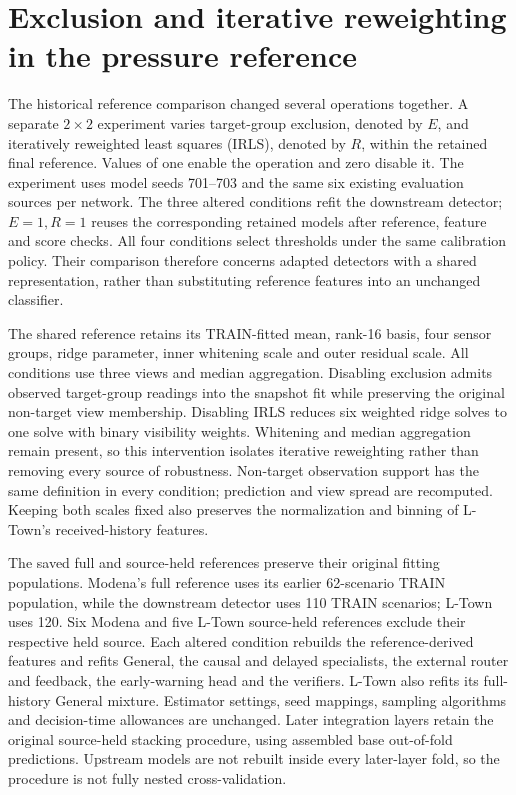 \section{Exclusion and iterative reweighting in the pressure reference}
\label{sec:reference_factorial}
The historical reference comparison changed several operations together. A separate $2\times2$ experiment varies target-group exclusion, denoted by $E$, and iteratively reweighted least squares (IRLS), denoted by $R$, within the retained final reference. Values of one enable the operation and zero disable it. The experiment uses model seeds 701--703 and the same six existing evaluation sources per network. The three altered conditions refit the downstream detector; $E=1,R=1$ reuses the corresponding retained models after reference, feature and score checks. All four conditions select thresholds under the same calibration policy. Their comparison therefore concerns adapted detectors with a shared representation, rather than substituting reference features into an unchanged classifier.

The shared reference retains its TRAIN-fitted mean, rank-16 basis, four sensor groups, ridge parameter, inner whitening scale and outer residual scale. All conditions use three views and median aggregation. Disabling exclusion admits observed target-group readings into the snapshot fit while preserving the original non-target view membership. Disabling IRLS reduces six weighted ridge solves to one solve with binary visibility weights. Whitening and median aggregation remain present, so this intervention isolates iterative reweighting rather than removing every source of robustness. Non-target observation support has the same definition in every condition; prediction and view spread are recomputed. Keeping both scales fixed also preserves the normalization and binning of L-Town's received-history features.

The saved full and source-held references preserve their original fitting populations. Modena's full reference uses its earlier 62-scenario TRAIN population, while the downstream detector uses 110 TRAIN scenarios; L-Town uses 120. Six Modena and five L-Town source-held references exclude their respective held source. Each altered condition rebuilds the reference-derived features and refits General, the causal and delayed specialists, the external router and feedback, the early-warning head and the verifiers. L-Town also refits its full-history General mixture. Estimator settings, seed mappings, sampling algorithms and decision-time allowances are unchanged. Later integration layers retain the original source-held stacking procedure, using assembled base out-of-fold predictions. Upstream models are not rebuilt inside every later-layer fold, so the procedure is not fully nested cross-validation.

